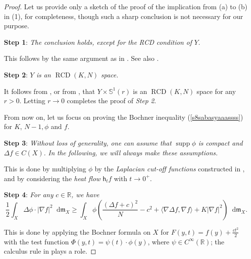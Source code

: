 \documentclass[11pt,reqno]{amsart}
\theoremstyle{definition}
\numberwithin{equation}{section}
\newcommand{\di}{\mathop{}\!\mathrm{d}}
\newcommand{\meas}{\mathfrak{m}}
\DeclareMathOperator{\RCD}{RCD}
\DeclareMathOperator{\supp}{supp}
\begin{document}
\begin{proof}
    Let us provide only a sketch of the proof of the implication from (a) to (b) in (1), for completeness, though such a sharp conclusion is not necessary for our purpose.

\smallskip

    \textbf{Step 1}: \textit{The conclusion holds, except for the RCD condition of $Y$.}
    
    \smallskip

This follows by the same argument as in \cite{Gsplit}. See also \cite{BNS, BPS, general}.

\smallskip

\textbf{Step 2}: \textit{$Y$ is an $\RCD(K, N)$ space.}

\smallskip

 It follows from \cite[Proposition 7.7 and Theorem 7.8]{AMSbe}, or from \cite[Theorem 18]{Serg}, that $Y\times \mathbb{S}^1(r)$ is an $\RCD(K,N)$ space for any $r>0$. Letting $r \to 0$ completes the proof of \textit{Step 2}.

\smallskip

From now on, let us focus on proving the Bochner inequality (\ref{s8sabasyaaassss}) for $K$, $N-1, \phi$ and $f$.

\smallskip

\textbf{Step 3}: \textit{Without loss of generality, one can assume that $\supp \phi$ is compact and $\Delta f \in C(X)$. In the following, we will always make these assumptions.}

\smallskip

This is done by multiplying  $\phi$ by the \textit{Laplacian cut-off functions} constructed in \cite[Proposition 2.39]{HondaSun}, and by considering the \textit{heat flow} $\mathsf{h}_tf$ with $t \to 0^+$.

\smallskip

\textbf{Step 4}: \textit{For any $c \in \mathbb{R}$, we have
\begin{equation}\label{bochreduce}
    \frac{1}{2}\int_X\Delta \phi \cdot |\nabla f|^2 \di \meas_X \ge \int_X\phi \left(\frac{(\Delta f+c)^2}{N}-c^2+\langle\nabla \Delta f, \nabla f\rangle +K|\nabla f|^2 \right)\di \meas_X.
\end{equation}}

\smallskip

This is done by applying the Bochner formula on $X$ for $F(y, t)=f(y)+\frac{ct^2}{2}$ with the test function $\Phi(y, t)=\psi(t)\cdot\phi(y)$, where $\psi \in C^{\infty}(\mathbb{R})$; the calculus rule in \cite{GRpartial} plays a role. 


\end{proof}
\end{document}
